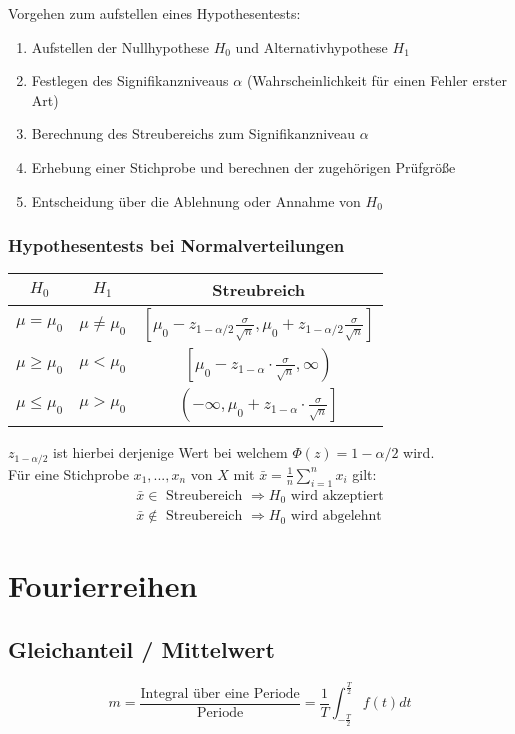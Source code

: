 \documentclass[12pt]{article}
\begin{document}
Vorgehen zum aufstellen eines Hypothesentests:
\begin{enumerate}
	\item Aufstellen der Nullhypothese $H_0$ und Alternativhypothese $H_1$
	\item Festlegen des Signifikanzniveaus $\alpha$ (Wahrscheinlichkeit für einen Fehler erster Art)
	\item Berechnung des Streubereichs zum Signifikanzniveau $\alpha$
	\item Erhebung einer Stichprobe und berechnen der zugehörigen Prüfgröße
	\item Entscheidung über die Ablehnung oder Annahme von $H_0$
\end{enumerate}
\subsubsection{Hypothesentests bei Normalverteilungen}
\begin{table}[H]
	\centering
	\begin{tabular}{|c|c|c|}
		\hline
		\textbf{$H_0$} & \textbf{$H_1$} & \textbf{Streubreich}\\\hline
		$\mu=\mu_0$ & $\mu\neq\mu_0$ & $\left[\mu_0-z_{1-\alpha/2}\frac{\sigma}{\sqrt{n}}, \mu_0+z_{1-\alpha/2}\frac{\sigma}{\sqrt{n}}\right]$\\\hline
		$\mu\geq\mu_0$ & $\mu<\mu_0$ & $\left[\mu_0-z_{1-\alpha}\cdot\frac{\sigma}{\sqrt{n}}, \infty\right)$\\\hline
		$\mu\leq\mu_0$ & $\mu>\mu_0$ & $\left(-\infty, \mu_0+z_{1-\alpha}\cdot \frac{\sigma}{\sqrt{n}}\right]$\\\hline
	\end{tabular}
\end{table}
$z_{1-\alpha/2}$ ist hierbei derjenige Wert bei welchem $\Phi (z) = 1-\alpha/2$ wird.\\ 
Für eine Stichprobe $x_1,...,x_n$ von $X$ mit $\bar{x}=\frac{1}{n}\sum_{i=1}^nx_i$ gilt:
\begin{gather*}
	\bar{x}\in \text{ Streubereich }\Rightarrow H_0 \text{ wird akzeptiert}\\
	\bar{x}\notin \text{ Streubereich }\Rightarrow H_0 \text{ wird abgelehnt}
\end{gather*}
\section{Fourierreihen}
\subsection{Gleichanteil / Mittelwert}
\begin{equation*}
	m=\frac{\text{Integral über eine Periode}}{\text{Periode}}=\frac{1}{T}\int_{-\frac{T}{2}}^{\frac{T}{2}}f(t)dt
\end{equation*}
\end{document}
